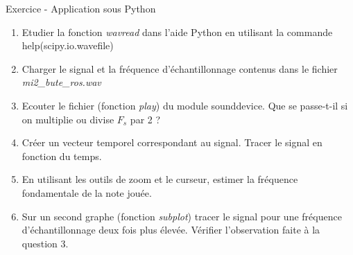 \documentclass{beamer}
\newcounter{exampleBlockCounter}
\begin{document}
\begin{frame}
	\begin{exampleblock}{Exercice  - Application sous Python}
		\begin{enumerate}\justifying
			  \item Etudier la fonction \textit{wavread} dans l'aide Python en utilisant la commande help(scipy.io.wavefile)
			  \item Charger le signal et la fréquence d'échantillonnage contenus dans le fichier \textit{mi2\_bute\_ros.wav}
			  \item Ecouter le fichier (fonction \textit{play}) du module sounddevice.  Que se passe-t-il si on multiplie ou divise $F_{s}$ par 2 ?
			  \item Créer un vecteur temporel correspondant au signal. Tracer le signal en fonction du temps.
			  \item En utilisant les outils de zoom et le curseur, estimer la fréquence fondamentale de la note jouée.
			  \item Sur un second graphe (fonction \textit{subplot}) tracer le signal pour une fréquence d'échantillonnage deux fois plus élevée. Vérifier l'observation faite à la question 3.   
		\end{enumerate}
	\end{exampleblock}
\end{frame}
\end{document}
